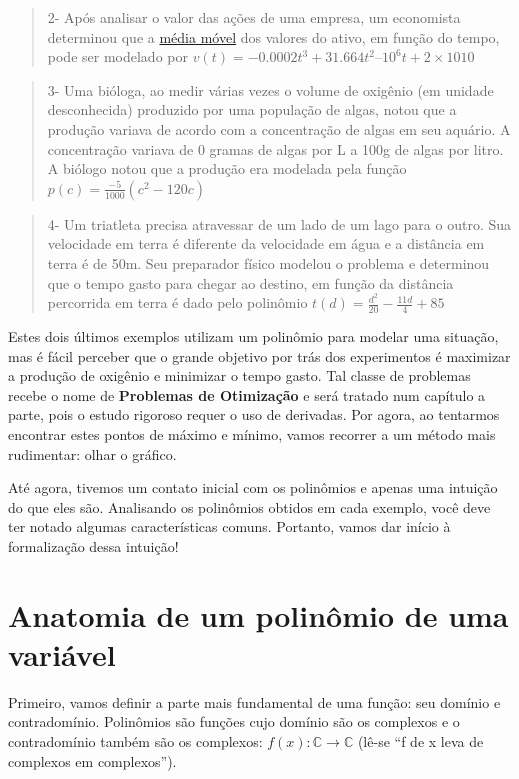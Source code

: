 \documentclass[
  letterpaper,
  DIV=11,
  numbers=noendperiod]{scrreprt}
\begin{document}
\begin{quote}
2- Após analisar o valor das ações de uma empresa, um economista
determinou que a \href{https://pt.wikipedia.org/wiki/Média_móvel}{média
móvel} dos valores do ativo, em função do tempo, pode ser modelado por
\(v(t) = −0.0002t^3+31.664t^2–10^6t+2×1010\)
\end{quote}

\begin{quote}
3- Uma bióloga, ao medir várias vezes o volume de oxigênio (em unidade
desconhecida) produzido por uma população de algas, notou que a produção
variava de acordo com a concentração de algas em seu aquário. A
concentração variava de 0 gramas de algas por L a 100g de algas por
litro. A biólogo notou que a produção era modelada pela função
\(p(c) = \frac{-5}{1000}(c^2-120c)\)
\end{quote}

\begin{quote}
4- Um triatleta precisa atravessar de um lado de um lago para o outro.
Sua velocidade em terra é diferente da velocidade em água e a distância
em terra é de 50m. Seu preparador físico modelou o problema e determinou
que o tempo gasto para chegar ao destino, em função da distância
percorrida em terra é dado pelo polinômio
\(t(d) = \frac{d^2}{20}-\frac{11d}{4}+85\)
\end{quote}

Estes dois últimos exemplos utilizam um polinômio para modelar uma
situação, mas é fácil perceber que o grande objetivo por trás dos
experimentos é maximizar a produção de oxigênio e minimizar o tempo
gasto. Tal classe de problemas recebe o nome de \textbf{Problemas de
Otimização} e será tratado num capítulo a parte, pois o estudo rigoroso
requer o uso de derivadas. Por agora, ao tentarmos encontrar estes
pontos de máximo e mínimo, vamos recorrer a um método mais rudimentar:
olhar o gráfico.

Até agora, tivemos um contato inicial com os polinômios e apenas uma
intuição do que eles são. Analisando os polinômios obtidos em cada
exemplo, você deve ter notado algumas características comuns. Portanto,
vamos dar início à formalização dessa intuição!

\section{Anatomia de um polinômio de uma
variável}\label{anatomia-de-um-polinuxf4mio-de-uma-variuxe1vel}

Primeiro, vamos definir a parte mais fundamental de uma função: seu
domínio e contradomínio. Polinômios são funções cujo domínio são os
complexos e o contradomínio também são os complexos:
\(f(x): \mathbb{C} \to\mathbb{C}\) (lê-se ``f de x leva de complexos em
complexos'').
\end{document}

